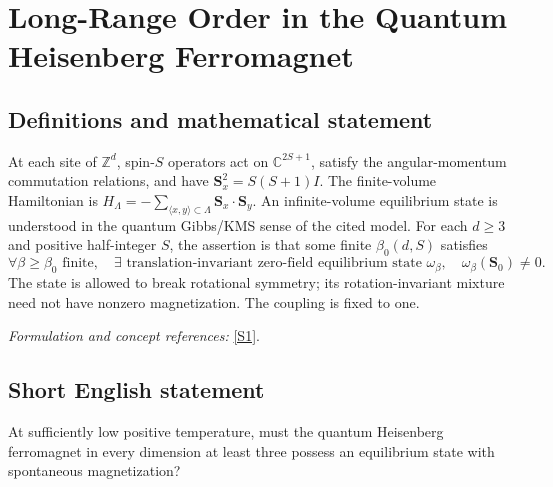 \documentclass[11pt]{article}
\newcommand{\Z}{\mathbb{Z}}
\newcommand{\C}{\mathbb{C}}
\newcommand{\sref}[2]{\hyperlink{source:#1:#2}{[S#2]}}
\newif\ifshowcatalogue
\newcommand{\cataloguescope}[1]{\ifshowcatalogue
	\paragraph{Exact scope in the supplied catalogue.}
	\begin{quote}\small #1\end{quote}\fi}
\begin{document}
\setcounter{section}{0}
	\clearpage
\section*{\texorpdfstring{Long-Range Order in the Quantum Heisenberg Ferromagnet}{Long-Range Order in the Quantum Heisenberg Ferromagnet}}\label{statement}
	\subsection{Definitions and mathematical statement}
	At each site of $\Z^d$, spin-$S$ operators act on $\C^{2S+1}$, satisfy the angular-momentum commutation relations, and have $\mathbf S_x^2=S(S+1)I$. The finite-volume Hamiltonian is
	$H_\Lambda=-\sum_{\langle x,y\rangle\subset\Lambda}\mathbf S_x\cdot\mathbf S_y$.
	An infinite-volume equilibrium state is understood in the quantum Gibbs/KMS sense of the cited model. For each $d\ge3$ and positive half-integer $S$, the assertion is that some finite $\beta_0(d,S)$ satisfies
	\[
	\forall\beta\ge\beta_0\text{ finite},\quad
	\exists\text{ translation-invariant zero-field equilibrium state }\omega_\beta,
	\quad\omega_\beta(\mathbf S_0)\ne0.
	\]
	The state is allowed to break rotational symmetry; its rotation-invariant mixture need not have nonzero magnetization. The coupling is fixed to one.
	\par\smallskip\textit{Formulation and concept references:} \sref{statement}{1}.
	\cataloguescope{For the nearest-neighbor isotropic spin-S quantum Heisenberg ferromagnet on Z\textasciicircum{}d with Hamiltonian H=-sum\_\{<x,y>\} S\_x dot S\_y, assert: for every integer d>=3 and every S in\{1/2,1,3/2,...\}, there is a finite beta\_0(d,S)>0 such that for each finite beta>=beta\_0 the infinite-volume zero-field model admits a translation-invariant equilibrium Gibbs state with nonzero spin expectation. Nonzero expectation refers to spontaneous magnetization in a symmetry-breaking state, not the rotation-invariant mixture. Coupling J=1 fixes temperature units; no pointwise-correlation equivalence is asserted.}
	\subsection{Short English statement}
	At sufficiently low positive temperature, must the quantum Heisenberg ferromagnet in every dimension at least three possess an equilibrium state with spontaneous magnetization?
\end{document}
